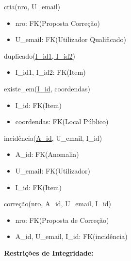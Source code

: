 \documentclass[12pt]{report}
\begin{document}
\begin{multicols}{2}
\vspace{5mm}


cria(\underline{nro}, U\_email)
    \begin{itemize}
    \item nro: FK(Proposta Correção)
    \item U\_email: FK(Utilizador Qualificado)
    \end{itemize}   


\vspace{5mm}



duplicado(\underline{I\_id1, I\_id2})
    \begin{itemize}
    \item I\_id1, I\_id2: FK(Item)
    \end{itemize}


\vspace{5mm}


existe\_em(\underline{I\_id}, coordendas)
    \begin{itemize}
    \item I\_id: FK(Item)
    \item coordendas: FK(Local Público)
    \end{itemize}


\vspace{5mm}


incidência(\underline{A\_id}, U\_email, I\_id)
    \begin{itemize}
    \item A\_id: FK(Anomalia)
    \item U\_email: FK(Utilizador)
    \item I\_id: FK(Item)
    \end{itemize}


\vspace{5mm}


correção(\underline{nro, A\_id, U\_email, I\_id})
    \begin{itemize}
    \item nro: FK(Proposta de Correção)
    \item A\_id, U\_email, I\_id: FK(incidência)
    \end{itemize}

\end{multicols}

\Large
\textbf{Restrições de Integridade: }\\
\end{document}
